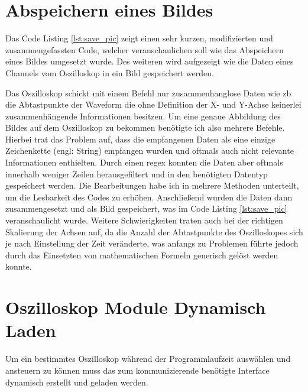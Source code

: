 \section{Abspeichern eines Bildes}
\label{sec:save_pic}

Das Code Listing \ref{lst:save_pic} zeigt einen sehr kurzen, modifizierten und zusammengefassten Code, welcher veranschaulichen soll wie das Abspeichern eines Bildes umgesetzt wurde. Des weiteren wird aufgezeigt wie die Daten eines Channels vom Oszilloskop in ein Bild gespeichert werden.


Das Oszilloskop schickt mit einem Befehl nur zusammenhanglose Daten wie \ac{zb} die Abtastpunkte der Waveform die ohne Definition der X- und Y-Achse keinerlei zusammenhängende Informationen besitzen. Um eine genaue Abbildung des Bildes auf dem Oszilloskop zu bekommen benötigte ich also mehrere Befehle. Hierbei trat das Problem auf, dass die empfangenen Daten als eine einzige Zeichenkette (engl: String) empfangen wurden und oftmals auch nicht relevante Informationen enthielten. Durch einen \ac{regex} konnten die Daten aber oftmals innerhalb weniger Zeilen herausgefiltert und in den benötigten Datentyp gespeichert werden. Die Bearbeitungen habe ich in mehrere Methoden unterteilt, um die Lesbarkeit des Codes zu erhöhen. Anschließend wurden die Daten dann zusammengesetzt und als Bild gespeichert, was im Code Listing \ref{lst:save_pic} veranschaulicht wurde. Weitere Schwierigkeiten traten auch bei der richtigen Skalierung der Achsen auf, da die Anzahl der Abtastpunkte des Oszilloskopes sich je nach Einstellung der Zeit veränderte, was anfangs zu Problemen führte jedoch durch das Einsetzten von mathematischen Formeln generisch gelöst werden konnte. 

\section{Oszilloskop Module Dynamisch Laden}
\label{sec:dynamic_load}

Um ein bestimmtes Oszilloskop während der Programmlaufzeit auswählen und ansteuern zu können muss das zum kommunizierende benötigte Interface dynamisch erstellt und geladen werden.


